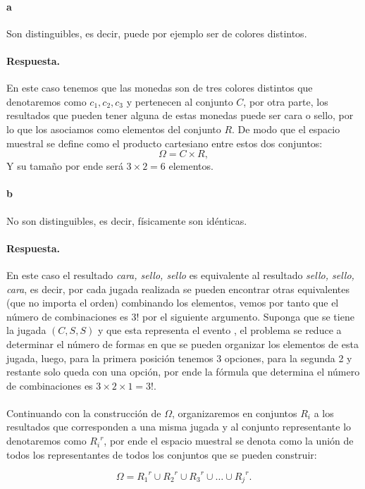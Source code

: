 \documentclass{article}
\begin{document}
\paragraph{a} Son distinguibles, es decir, puede por ejemplo ser de colores distintos.
\paragraph{Respuesta.} En este caso tenemos que las monedas son de tres colores distintos que denotaremos como $c_1, c_2, c_3$ y pertenecen al conjunto $C$, por otra parte, los resultados que pueden tener alguna de estas monedas puede ser cara o sello, por lo que los asociamos como elementos del conjunto $R$. De modo que el espacio muestral se define como el producto cartesiano entre estos dos conjuntos:
$$\Omega = C \times R,$$
Y su tamaño por ende será $3 \times 2 = 6$ elementos.
\paragraph{b}No son distinguibles, es decir, físicamente son idénticas.
\paragraph{Respuesta.} En este caso el resultado \textit{cara, sello, sello} es equivalente al resultado \textit{sello, sello, cara}, es decir, por cada jugada realizada se pueden encontrar otras equivalentes (que no importa el orden) combinando los elementos, vemos por tanto que el número de combinaciones es $3!$ por el siguiente argumento. Suponga que se tiene la jugada $(C,S,S)$ y que esta representa el evento , el problema se reduce a determinar el número de formas en que se pueden organizar los elementos de esta jugada, luego, para la primera posición tenemos 3 opciones, para la segunda 2 y restante solo queda con una opción, por ende la fórmula que determina el número de combinaciones es $3\times2\times1 = 3!$.
\paragraph{}Continuando con la construcción de $\Omega$, organizaremos en conjuntos $R_i$ a los resultados que corresponden a una misma jugada y al conjunto representante lo denotaremos como ${R_i}^r$, por ende el espacio muestral se denota como la unión de todos los representantes de todos los conjuntos que se pueden construir:

$$\Omega = {R_1}^r \cup {R_2}^r \cup {R_3}^r \cup \dots \cup {R_j}^r.$$
\end{document}
